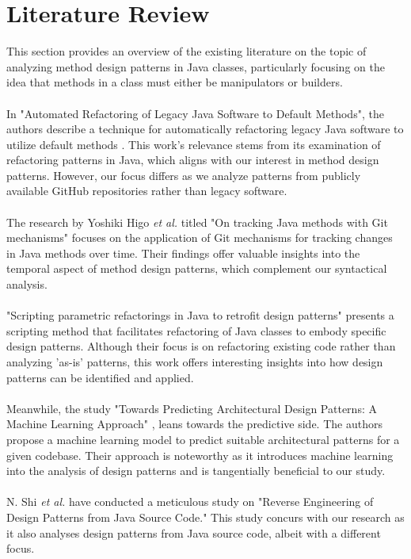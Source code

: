 \documentclass[draft]{article}
\begin{document}
\section{Literature Review}
This section provides an overview of the existing literature on the topic of analyzing method design patterns in Java classes, particularly focusing on the idea that methods in a class must either be manipulators or builders.\\
~\\
In "{}Automated Refactoring of Legacy Java Software to Default Methods"{}, the authors describe a technique for automatically refactoring legacy Java software to utilize default methods \cite{ref1}. This work's relevance stems from its examination of refactoring patterns in Java, which aligns with our interest in method design patterns. However, our focus differs as we analyze patterns from publicly available GitHub repositories rather than legacy software.\\
~\\
The research by Yoshiki Higo \textit{et al.}\cite{ref2} titled "{}On tracking Java methods with Git mechanisms"{} focuses on the application of Git mechanisms for tracking changes in Java methods over time. Their findings offer valuable insights into the temporal aspect of method design patterns, which complement our syntactical analysis.\\
~\\
"{}Scripting parametric refactorings in Java to retrofit design patterns"{} \cite{ref3} presents a scripting method that facilitates refactoring of Java classes to embody specific design patterns. Although their focus is on refactoring existing code rather than analyzing 'as-is' patterns, this work offers interesting insights into how design patterns can be identified and applied.\\
~\\
Meanwhile, the study "{}Towards Predicting Architectural Design Patterns: A Machine Learning Approach"{} \cite{ref4}, leans towards the predictive side. The authors propose a machine learning model to predict suitable architectural patterns for a given codebase. Their approach is noteworthy as it introduces machine learning into the analysis of design patterns and is tangentially beneficial to our study.\\
~\\
N. Shi \textit{et al.} \cite{ref5} have conducted a meticulous study on "{}Reverse Engineering of Design Patterns from Java Source Code."{} This study concurs with our research as it also analyses design patterns from Java source code, albeit with a different focus.\\
\end{document}
